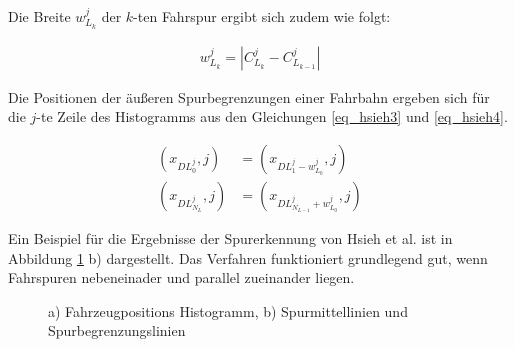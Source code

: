 Die Breite $w_{L_k}^{j}$ der $k$-ten Fahrspur ergibt sich zudem wie folgt:

\begin{ceqn}
\begin{align}
\label{eq_hsieh2}
    w_{L_k}^{j} = | C_{L_{k}}^{j} - C_{L_{k-1}}^{j} |
\end{align}
\end{ceqn}

Die Positionen der äußeren Spurbegrenzungen einer Fahrbahn ergeben sich für die $j$-te Zeile des Histogramms
aus den Gleichungen \ref{eq_hsieh3} und \ref{eq_hsieh4}.

\begin{ceqn}
\begin{align}
\label{eq_hsieh3}
    (x_{DL_0^j}, j) &= (x_{DL_1^j - w_{L_0}^j}, j) \\
\label{eq_hsieh4}
    (x_{DL_{N_L}^j}, j) &= (x_{DL_{N_{L-1}}^j + w_{L_0}^j}, j)
\end{align}
\end{ceqn}

Ein Beispiel für die Ergebnisse der Spurerkennung von Hsieh et al. ist in Abbildung \ref{fig:relw_hsieh_results} b) dargestellt.
Das Verfahren funktioniert grundlegend gut, wenn Fahrspuren nebeneinader und parallel zueinander liegen.

\begin{figure}[H]
    \centering
    \caption[Ergebnisse Histogramm Erstellung und Spurextraktion (Hsieh et al.)]{a) Fahrzeugpositions Histogramm, b) Spurmittellinien und Spurbegrenzungslinien \cite[]{Hsieh2006}}
    \label{fig:relw_hsieh_results}
\end{figure}


